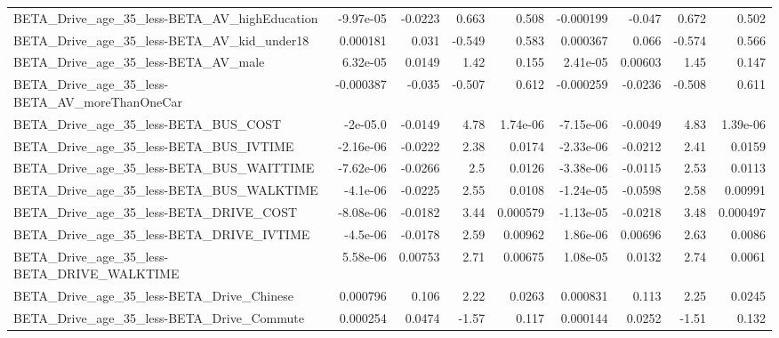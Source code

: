 \begin{tabular}{lrrrrrrrr}
BETA\_Drive\_age\_35\_less-BETA\_AV\_highEducation       &   -9.97e-05 &      -0.0223 &    0.663 &    0.508 &  -0.000199 &      -0.047 &        0.672 &         0.502 \\
BETA\_Drive\_age\_35\_less-BETA\_AV\_kid\_under18         &    0.000181 &        0.031 &   -0.549 &    0.583 &   0.000367 &       0.066 &       -0.574 &         0.566 \\
BETA\_Drive\_age\_35\_less-BETA\_AV\_male                &    6.32e-05 &       0.0149 &     1.42 &    0.155 &   2.41e-05 &     0.00603 &         1.45 &         0.147 \\
BETA\_Drive\_age\_35\_less-BETA\_AV\_moreThanOneCar      &   -0.000387 &       -0.035 &   -0.507 &    0.612 &  -0.000259 &     -0.0236 &       -0.508 &         0.611 \\
BETA\_Drive\_age\_35\_less-BETA\_BUS\_COST               &    -2e-05.0 &      -0.0149 &     4.78 & 1.74e-06 &  -7.15e-06 &     -0.0049 &         4.83 &      1.39e-06 \\
BETA\_Drive\_age\_35\_less-BETA\_BUS\_IVTIME             &   -2.16e-06 &      -0.0222 &     2.38 &   0.0174 &  -2.33e-06 &     -0.0212 &         2.41 &        0.0159 \\
BETA\_Drive\_age\_35\_less-BETA\_BUS\_WAITTIME           &   -7.62e-06 &      -0.0266 &      2.5 &   0.0126 &  -3.38e-06 &     -0.0115 &         2.53 &        0.0113 \\
BETA\_Drive\_age\_35\_less-BETA\_BUS\_WALKTIME           &    -4.1e-06 &      -0.0225 &     2.55 &   0.0108 &  -1.24e-05 &     -0.0598 &         2.58 &       0.00991 \\
BETA\_Drive\_age\_35\_less-BETA\_DRIVE\_COST             &   -8.08e-06 &      -0.0182 &     3.44 & 0.000579 &  -1.13e-05 &     -0.0218 &         3.48 &      0.000497 \\
BETA\_Drive\_age\_35\_less-BETA\_DRIVE\_IVTIME           &    -4.5e-06 &      -0.0178 &     2.59 &  0.00962 &   1.86e-06 &     0.00696 &         2.63 &        0.0086 \\
BETA\_Drive\_age\_35\_less-BETA\_DRIVE\_WALKTIME         &    5.58e-06 &      0.00753 &     2.71 &  0.00675 &   1.08e-05 &      0.0132 &         2.74 &        0.0061 \\
BETA\_Drive\_age\_35\_less-BETA\_Drive\_Chinese          &    0.000796 &        0.106 &     2.22 &   0.0263 &   0.000831 &       0.113 &         2.25 &        0.0245 \\
BETA\_Drive\_age\_35\_less-BETA\_Drive\_Commute          &    0.000254 &       0.0474 &    -1.57 &    0.117 &   0.000144 &      0.0252 &        -1.51 &         0.132 \\

\end{tabular}
